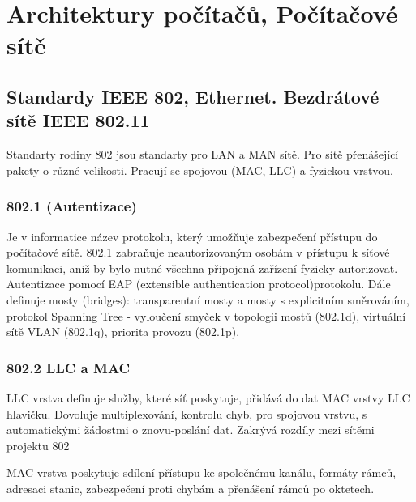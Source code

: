 \section{Architektury počítačů, Počítačové sítě}
\subsection{Standardy IEEE 802, Ethernet. Bezdrátové sítě IEEE 802.11}
Standarty rodiny 802 jsou standarty pro LAN a MAN sítě. Pro sítě přenášející pakety o různé velikosti. Pracují se spojovou (MAC, LLC) a fyzickou vrstvou.

\subsubsection{802.1 (Autentizace)} 
Je v informatice název protokolu, který umožňuje zabezpečení přístupu do počítačové sítě. 802.1 zabraňuje neautorizovaným osobám v přístupu k síťové komunikaci, aniž by bylo nutné všechna připojená zařízení fyzicky autorizovat. Autentizace pomocí EAP (extensible authentication protocol)protokolu.
Dále definuje mosty (bridges): transparentní mosty a mosty s explicitním směrováním, protokol Spanning Tree - vyloučení smyček v topologii mostů (802.1d),
virtuální sítě VLAN (802.1q), priorita provozu (802.1p).


\subsubsection{802.2 LLC a MAC} 
LLC vrstva definuje služby, které síť poskytuje, přidává do dat MAC vrstvy LLC hlavičku. Dovoluje multiplexování, kontrolu chyb, pro spojovou vrstvu, s automatickými žádostmi o znovu-poslání dat. Zakrývá rozdíly mezi sítěmi projektu 802 

MAC vrstva poskytuje sdílení přístupu ke společnému kanálu, formáty rámců, adresaci stanic, zabezpečení proti chybám a přenášení rámců po oktetech.
